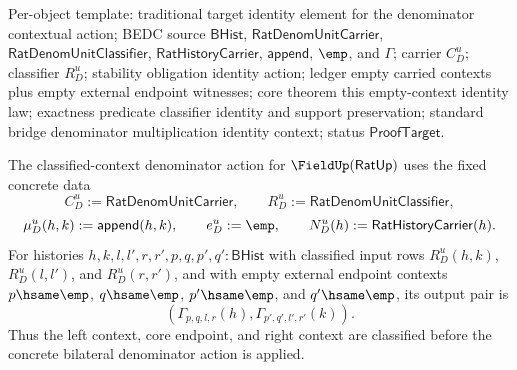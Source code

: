Per-object template: traditional target identity element for the denominator
contextual action; BEDC source $\mathsf{BHist}$,
$\mathsf{RatDenomUnitCarrier}$, $\mathsf{RatDenomUnitClassifier}$,
$\mathsf{RatHistoryCarrier}$, $\mathsf{append}$, $\emp$, and $\Gamma$; carrier
$C_D^u$; classifier $R_D^u$; stability obligation identity action; ledger empty
carried contexts plus empty external endpoint witnesses; core theorem this
empty-context identity law; exactness predicate classifier identity and support
preservation; standard bridge denominator multiplication identity context;
status $\mathsf{ProofTarget}$.

\begin{definition}
\label{def:ratup-fieldup-denominator-classified-context-action}
The classified-context denominator action for $\FieldUp(\mathsf{RatUp})$ uses
the fixed concrete data
$$
C_D^u:=\mathsf{RatDenomUnitCarrier},\qquad
R_D^u:=\mathsf{RatDenomUnitClassifier},
$$
$$
\mu_D^u(h,k):=\mathsf{append}(h,k),\qquad
e_D^u:=\emp,\qquad
N_D^u(h):=\mathsf{RatHistoryCarrier}(h).
$$
For histories $h,k,l,l',r,r',p,q,p',q':\mathsf{BHist}$ with classified input
rows $R_D^u(h,k)$, $R_D^u(l,l')$, and $R_D^u(r,r')$, and with empty external
endpoint contexts $p\hsame\emp$, $q\hsame\emp$, $p'\hsame\emp$, and
$q'\hsame\emp$, its output pair is
$$
(\Gamma_{p,q,l,r}(h),\Gamma_{p',q',l',r'}(k)).
$$
Thus the left context, core endpoint, and right context are classified before
the concrete bilateral denominator action is applied.
\end{definition}

